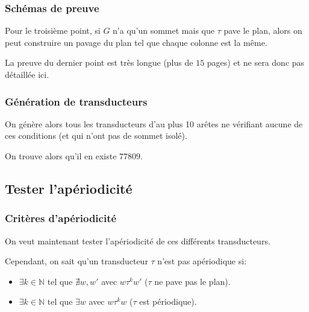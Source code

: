 \documentclass{beamer}
\newcommand{\N}{\mathbb N}
\begin{document}
\begin{frame}
\frametitle{Schémas de preuve}

    Pour le troisième point, si $G$ n'a qu'un sommet mais que $\tau$ pave le plan, alors on peut construire un pavage
    du plan tel que chaque colonne est la même.
    
    \;
    
    La preuve du dernier point est très longue (plus de $15$ pages) et ne sera donc pas détaillée ici.
\end{frame}

\begin{frame}
\frametitle{Génération de transducteurs}

On génère alors tous les transducteurs d'au plus 10 arêtes ne vérifiant aucune de ces conditions (et qui n'ont pas de sommet isolé).

On trouve alors qu'il en existe $77809$.

\end{frame}

\subsection{Tester l'apériodicité}

\begin{frame}
\frametitle{Critères d'apériodicité}

On veut maintenant tester l'apériodicité de ces différents transducteurs.

Cependant, on sait qu'un transducteur $\tau$ n'est pas apériodique si:

\begin{itemize}
    \item $\exists k \in \N$ tel que $\nexists w,w'$ avec $w \tau^k w'$ ($\tau$ ne pave pas le plan).
    \item $\exists k \in \N$ tel que $\exists w$ avec $w \tau^k w$ ($\tau$ est périodique).
\end{itemize}
    
\end{frame}
\end{document}

